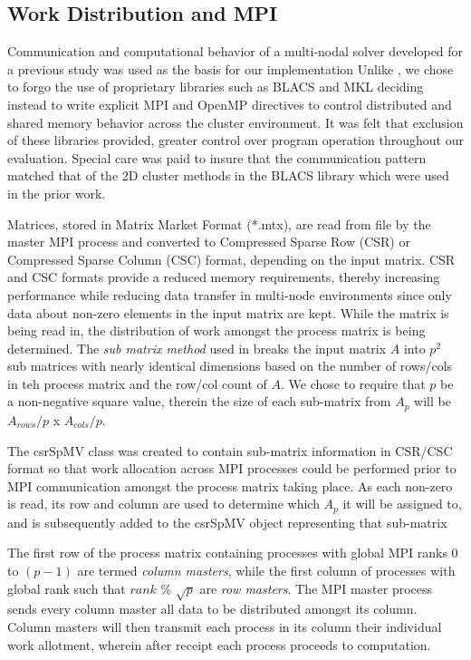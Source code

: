 \subsection{Work Distribution and MPI}

Communication and computational behavior of a multi-nodal solver developed for a previous study \cite{techbib:6933066} was used as the basis for our implementation
Unlike \cite{techbib:6933066}, we chose to forgo the use of proprietary libraries such as BLACS and MKL deciding instead to write explicit MPI and OpenMP directives to control distributed and shared memory behavior across the cluster environment. 
It was felt that exclusion of these libraries provided, greater control over program operation throughout our evaluation.
Special care was paid to insure that the communication pattern matched that of the 2D cluster methods in the BLACS library which were used in the prior work.
 

Matrices, stored in Matrix Market Format (*.mtx), are read from file by the master MPI process and converted to Compressed Sparse Row (CSR) or Compressed Sparse Column (CSC) format, depending on the input matrix.
CSR and CSC formats provide a reduced memory requirements, thereby increasing performance while reducing data transfer in multi-node environments since only data about non-zero elements in the input matrix are kept. 
While the matrix is being read in, the distribution of work amongst the process matrix is being determined. 
The \emph{sub matrix method} used in \cite{techbib:6933066} breaks the input matrix $A$ into $p^2$ sub matrices with nearly identical dimensions based on the number of rows/cols in teh process matrix and the row/col count of $A$.
We chose to require that $p$ be a non-negative square value, therein the size of each sub-matrix from $A_p$ will be $A_{rows}/p$  x $A_{cols}/p$. 


The csrSpMV class was created to contain sub-matrix information in CSR/CSC format so that work allocation across MPI processes could be performed prior to MPI communication amongst the process matrix taking place. 
As each non-zero is read, its row and column are used to determine which $A_p$ it will be assigned to, and is subsequently added to the csrSpMV object representing that sub-matrix 


The first row of the process matrix containing processes with global MPI ranks $0$ to $(p-1)$ are termed \emph{column masters}, while the first column of processes with global rank such that $rank$ \% $\sqrt{p}$ are \emph{row masters}.
The MPI master process sends every column master all data to be distributed amongst its column.
Column masters will then transmit each process in its column their individual work allotment, wherein after receipt each process proceeds to computation.

